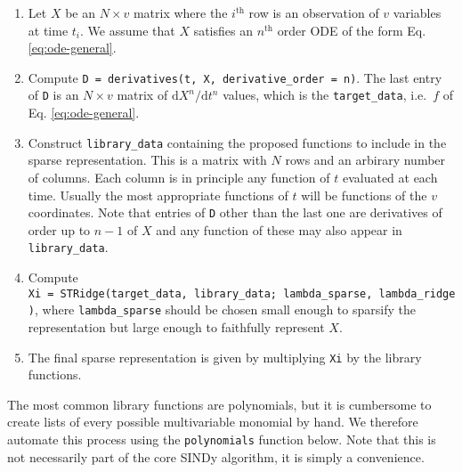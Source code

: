 \documentclass[
]{article}
\providecommand{\tightlist}{%
  \setlength{\itemsep}{0pt}\setlength{\parskip}{0pt}}\usepackage{longtable,booktabs,array}
\begin{document}
\begin{tcolorbox}[enhanced jigsaw, toptitle=1mm, bottomtitle=1mm, bottomrule=.15mm, titlerule=0mm, toprule=.15mm, opacityback=0, rightrule=.15mm, colback=white, colframe=quarto-callout-tip-color-frame, left=2mm, colbacktitle=quarto-callout-tip-color!10!white, title={SINDy {[}standard{]}}, arc=.35mm, breakable, coltitle=black, opacitybacktitle=0.6, leftrule=.75mm]

\begin{enumerate}
\def\labelenumi{\arabic{enumi}.}
\tightlist
\item
  Let \(X\) be an \(N \times v\) matrix where the \(i^\text{th}\) row is
  an observation of \(v\) variables at time \(t_i\). We assume that
  \(X\) satisfies an \(n^\text{th}\) order ODE of the form Eq.
  \eqref{eq:ode-general}.
\item
  Compute \texttt{D\ =\ derivatives(t,\ X,\ derivative\_order\ =\ n)}.
  The last entry of \texttt{D} is an \(N \times v\) matrix of
  \(\text{d}X^n/\text{d}t^n\) values, which is the
  \texttt{target\_data}, i.e.~\(f\) of Eq. \eqref{eq:ode-general}.
\item
  Construct \texttt{library\_data} containing the proposed functions to
  include in the sparse representation. This is a matrix with \(N\) rows
  and an arbirary number of columns. Each column is in principle any
  function of \(t\) evaluated at each time. Usually the most appropriate
  functions of \(t\) will be functions of the \(v\) coordinates. Note
  that entries of \texttt{D} other than the last one are derivatives of
  order up to \(n - 1\) of \(X\) and any function of these may also
  appear in \texttt{library\_data}.
\item
  Compute
  \texttt{Xi\ =\ STRidge(target\_data,\ library\_data;\ lambda\_sparse,\ lambda\_ridge)},
  where \texttt{lambda\_sparse} should be chosen small enough to
  sparsify the representation but large enough to faithfully represent
  \(X\).
\item
  The final sparse representation is given by multiplying \texttt{Xi} by
  the library functions.
\end{enumerate}

\end{tcolorbox}

The most common library functions are polynomials, but it is cumbersome
to create lists of every possible multivariable monomial by hand. We
therefore automate this process using the \texttt{polynomials} function
below. Note that this is not necessarily part of the core SINDy
algorithm, it is simply a convenience.
\end{document}
